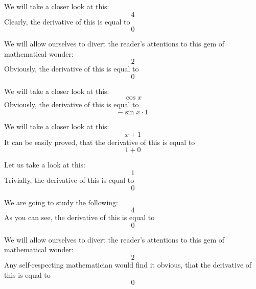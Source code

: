 \documentclass{article}
\begin{document}
We will take a closer look at this:
\begin{equation}
4 
\end{equation}
Clearly, the derivative of this is equal to
\begin{equation}
0 
\end{equation}

We will allow ourselves to divert the reader's attentions to this gem of mathematical wonder:
\begin{equation}
2 
\end{equation}
Obviously, the derivative of this is equal to
\begin{equation}
0 
\end{equation}

We will take a closer look at this:
\begin{equation}
\cos x 
\end{equation}
Obviously, the derivative of this is equal to
\begin{equation}
-\sin x \cdot 1 
\end{equation}

We will take a closer look at this:
\begin{equation}
x + 1 
\end{equation}
It can be easily proved, that the derivative of this is equal to
\begin{equation}
1 + 0 
\end{equation}

Let us take a look at this:
\begin{equation}
1 
\end{equation}
Trivially, the derivative of this is equal to
\begin{equation}
0 
\end{equation}

We are going to study the following:
\begin{equation}
4 
\end{equation}
As you can see, the derivative of this is equal to
\begin{equation}
0 
\end{equation}

We will allow ourselves to divert the reader's attentions to this gem of mathematical wonder:
\begin{equation}
2 
\end{equation}
Any self-respecting mathematician would find it obvious, that the derivative of this is equal to
\begin{equation}
0 
\end{equation}
\end{document}
